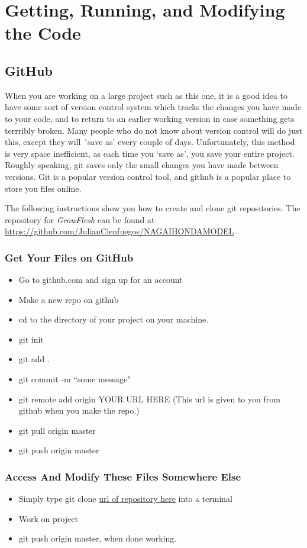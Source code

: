 \appendix
\label{appendix}
\chapter{Getting, Running, and Modifying the Code} 
\section{GitHub}
When you are working on a large project such as this one, it is a good idea to have some sort of version control system which tracks the changes you have made to your code, and to return to an earlier working version in case something  gets terrribly broken. Many people who do not know about version control will do just this, except they will ´save as' every couple of days. Unfortunately, this method is very space inefficient, as each time you `save as', you save your entire project. Roughly speaking, git saves only the small changes you have made between versions. Git is a popular version control  tool, and github is a popular place to store you files online.

The following instructions show you how to create and clone git repositories. The repository for \emph{GrowFlesh} can be found at \url{https://github.com/JulianCienfuegos/NAGAIHONDAMODEL}.

\subsection*{Get Your Files on GitHub}
\begin{itemize}
\item Go to github.com and sign up for an account
\item Make a new repo on github
\item cd to the directory of your project on your machine.
\item git init
\item git add .
\item git commit -m ``some message"
\item git remote add origin YOUR URL HERE (This url is given to you from github when you make the repo.)
\item git pull origin master
\item git push origin master
\end{itemize}

\subsection*{Access And Modify These Files Somewhere Else}
\begin{itemize}
\item Simply type git clone \url{url of repository here} into a terminal
\item Work on project
\item git push origin master, when done working.
\end{itemize}


